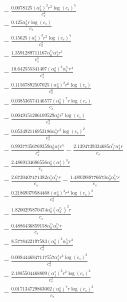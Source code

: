 \documentclass[10pt]{article}
\begin{document}
\begin{align*}
&{}  - \frac{0.0078125 \left(\alpha_{2}^s\right)^{2} r^{2} \log{\left(c_{s} \right)}^{5}}{c_{s}^{2}} \\
&{}  - \frac{0.125 \alpha_{6}^s r \log{\left(c_{s} \right)}}{c_{s}} \\
&{}  - \frac{0.15625 \left(\alpha_{1}^s\right)^{3} r^{2} \log{\left(c_{s} \right)}^{4}}{c_{s}^{2}} \\
&{}  - \frac{1.3591289711167 \alpha_{0}^{c_s} \alpha_{1}^s r^{5}}{c_{s}^{5}} \\
&{}  - \frac{10.642555341407 \left(\alpha_{0}^s\right)^{2} \alpha_{1}^{c_s} r^{4}}{c_{s}^{4}} \\
&{}  - \frac{0.11567892507025 \left(\alpha_{0}^s\right)^{2} r^{6} \log{\left(c_{s} \right)}}{c_{s}^{6}} \\
&{}  - \frac{0.038536574146577 \left(\alpha_{0}^s\right)^{7} r \log{\left(c_{s} \right)}}{c_{s}} \\
&{}  - \frac{0.0049151206109529 \alpha_{0}^s r^{7} \log{\left(c_{s} \right)}}{c_{s}^{7}} \\
&{}  - \frac{0.053492116953186 \alpha_{5}^s r^{2} \log{\left(c_{s} \right)}^{2}}{c_{s}^{2}} \\
&{}  - \frac{0.99377356769359 \alpha_{0}^s \alpha_{1}^s r^{5}}{c_{s}^{5}} - \frac{2.1394739334685 \alpha_{1}^{c_s} \alpha_{4}^s r}{c_{s}} \\
&{}  - \frac{2.4869134686556 \alpha_{0}^s \left(\alpha_{1}^s\right)^{3} r}{c_{s}} \\
&{}  - \frac{2.6720407471382 \alpha_{1}^s \alpha_{4}^{c_s} r}{c_{s}} - \frac{1.4893988776673 \alpha_{0}^s \alpha_{5}^{c_s} r}{c_{s}} \\
&{}  - \frac{0.21869379584468 \left(\alpha_{0}^s\right)^{4} r^{4} \log{\left(c_{s} \right)}^{3}}{c_{s}^{4}} \\
&{}  - \frac{1.8200295870474 \alpha_{0}^s \left(\alpha_{2}^{c_s}\right)^{2} r}{c_{s}} \\
&{}  - \frac{0.4886436859158 \alpha_{0}^{c_s} \alpha_{5}^{c_s} r}{c_{s}} \\
&{}  - \frac{8.5778422197583 \left(\alpha_{0}^s\right)^{2} \alpha_{3}^{c_s} r^{2}}{c_{s}^{2}} \\
&{}  - \frac{0.0084446847117557 \alpha_{4}^s r^{3} \log{\left(c_{s} \right)}^{3}}{c_{s}^{3}} \\
&{}  - \frac{2.1885504468809 \left(\alpha_{1}^s\right)^{3} r^{2} \log{\left(c_{s} \right)}^{2}}{c_{s}^{2}} \\
&{}  - \frac{0.017134729863002 \left(\alpha_{0}^s\right)^{7} r \log{\left(c_{s} \right)}^{3}}{c_{s}} \\

\end{align*}
\end{document}
